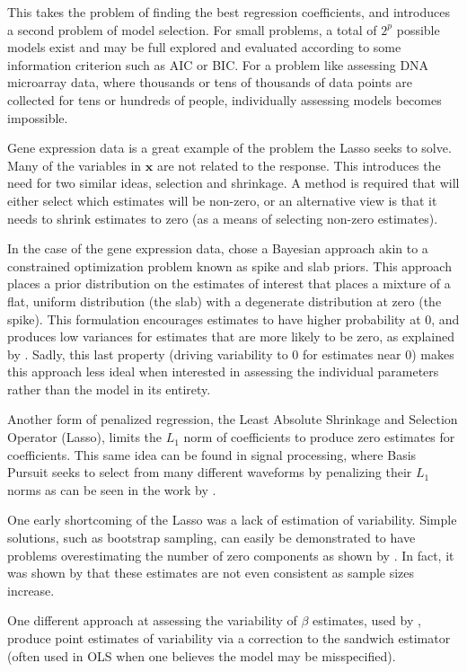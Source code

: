 \documentclass{uwstat572}
\begin{document}
This takes the problem of finding the best regression coefficients, and introduces a second problem of model selection. For small problems, a total of $2^p$ possible models exist and may be full explored and evaluated according to some information criterion such as AIC or BIC. For a problem like assessing DNA microarray data, where thousands or tens of thousands of data points are collected for tens or hundreds of people, individually assessing models becomes impossible.

Gene expression data is a great example of the problem the Lasso seeks to solve. Many of the variables in $\mathbf{x}$ are not related to the response. This introduces the need for two similar ideas, selection and shrinkage. A method is required that will either select which estimates will be non-zero, or an alternative view is that it needs to shrink estimates to zero (as a means of selecting non-zero estimates). 

In the case of the gene expression data, \cite{ishwaran2005spike} chose a Bayesian approach akin to a constrained optimization problem known as spike and slab priors. This approach places a prior distribution on the estimates of interest that places a mixture of a flat, uniform distribution (the slab) with a degenerate distribution at zero (the spike). This formulation encourages estimates to have higher probability at 0, and produces low variances for estimates that are more likely to be zero, as explained by \cite{ishwaran2005spike2}. Sadly, this last property (driving variability to 0 for estimates near 0) makes this approach less ideal when interested in assessing the individual parameters rather than the model in its entirety.

Another form of penalized regression, the Least Absolute Shrinkage and Selection Operator (Lasso), limits the $L_1$ norm of coefficients to produce zero estimates for coefficients. This same idea can be found in signal processing, where Basis Pursuit seeks to select from many different waveforms by penalizing their $L_1$ norms as can be seen in the work by \cite{chen2001atomic}.

One early shortcoming of the Lasso was a lack of estimation of variability. Simple solutions, such as bootstrap sampling, can easily be demonstrated to have problems overestimating the number of zero components as shown by \cite{kyung2010penalized}. In fact, it was shown by \cite{shao1996bootstrap} that these estimates are not even consistent as sample sizes increase. 

One different approach at assessing the variability of $\beta$ estimates, used by \cite{fan2001variable}, produce point estimates of variability via a correction to the sandwich estimator (often used in OLS when one believes the model may be misspecified).
\end{document}
